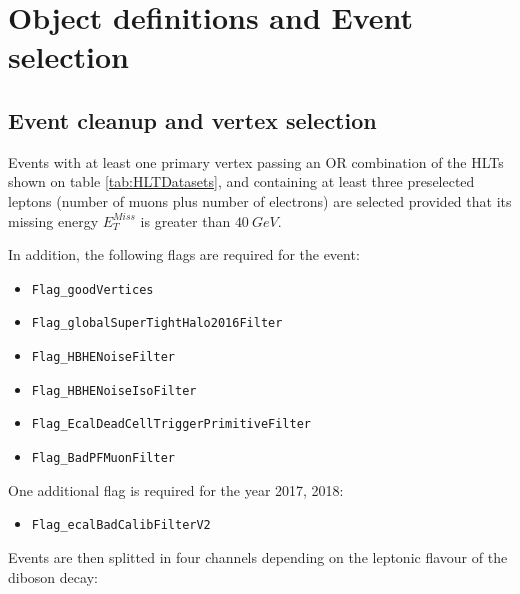 \section{Object definitions and Event selection}

\subsection{Event cleanup and vertex selection}

Events with at least one primary vertex passing an OR combination
of the HLTs shown on table \ref{tab:HLTDatasets}, and containing at least three
preselected leptons (number of muons plus number of electrons) are selected
provided that its missing energy $E_T^{Miss}$ is greater than $40~GeV$.

In addition, the following flags are required for the event:

\begin{itemize}
  \item \verb|Flag_goodVertices|
  \item \verb|Flag_globalSuperTightHalo2016Filter|
  \item \verb|Flag_HBHENoiseFilter|
  \item \verb|Flag_HBHENoiseIsoFilter|
  \item \verb|Flag_EcalDeadCellTriggerPrimitiveFilter|
  \item \verb|Flag_BadPFMuonFilter|
\end{itemize}

One additional flag is required for the year 2017, 2018:

\begin{itemize}
\item \verb|Flag_ecalBadCalibFilterV2|
\end{itemize}

Events are then splitted in four channels depending on the leptonic flavour of the
diboson decay:

